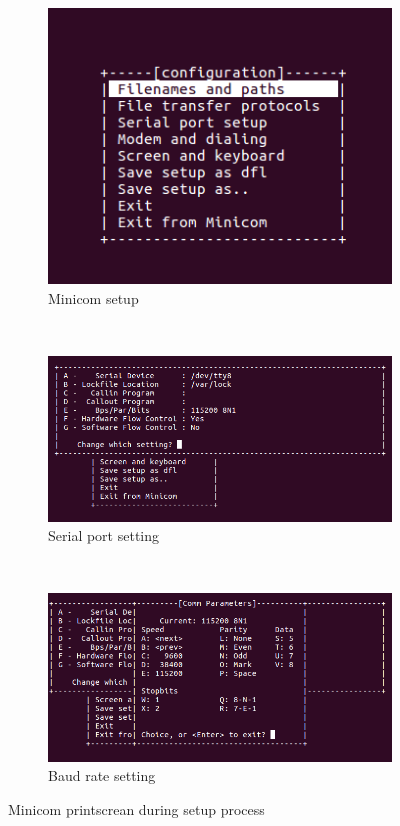 \documentclass[12pt,a4paper]{report}
\begin{document}
\begin{figure}[H]
    \centering
    \begin{subfigure}[b]{0.3\textwidth}
        \includegraphics[width=\textwidth]{figs/minicom.png}
        \caption{Minicom setup}
        \label{fig:miniSetup}
    \end{subfigure}
    ~
    \begin{subfigure}[b]{0.3\textwidth}
        \includegraphics[width=\textwidth]{figs/serialPort.png}
        \caption{Serial port setting}
        \label{fig:serial}
    \end{subfigure}
    ~
    \begin{subfigure}[b]{0.3\textwidth}
        \includegraphics[width=\textwidth]{figs/baud-rate.png}
        \caption{Baud rate setting}
        \label{fig:baud}
    \end{subfigure}
    \label{fig:mini}
    \caption{Minicom printscrean during setup process}
\end{figure}
\end{document}
